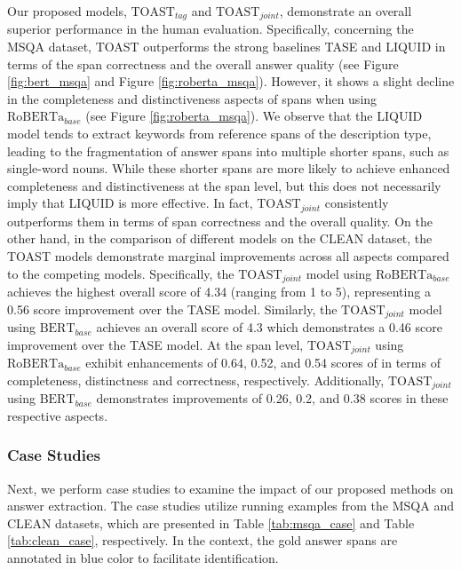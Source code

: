 \documentclass[a4paper]{cas-sc}
\newcommand{\1}[1]{\mathds{1}\left[#1\right]}
\newcommand{\figref}[1]{Figure \ref{#1}}
\newcommand{\tableref}[1]{Table \ref{#1}}
\begin{document}
Our proposed models, $\text{TOAST}_{tag}$ and $\text{TOAST}_{joint}$, demonstrate an overall superior performance in the human evaluation.
Specifically, concerning the MSQA dataset, TOAST outperforms the strong baselines TASE and LIQUID in terms of the span correctness and the overall answer quality (see \figref{fig:bert_msqa} and \figref{fig:roberta_msqa}). However, it shows a slight decline in the completeness and distinctiveness aspects of spans when using $\text{RoBERTa}_{base}$ (see  \figref{fig:roberta_msqa}). 
We observe that the LIQUID model tends to extract keywords from reference spans of the description type, leading to the fragmentation of answer spans into multiple shorter spans, such as single-word nouns. While these shorter spans are more likely to achieve enhanced completeness and distinctiveness at the span level, but this does not necessarily imply that LIQUID is more effective. In fact, $\text{TOAST}_{joint}$ consistently outperforms them in terms of span correctness and the overall quality. 
On the other hand, in the comparison of different models on the CLEAN dataset,
the TOAST models demonstrate marginal improvements across all aspects  compared to the competing models. 
Specifically, the $\text{TOAST}_{joint}$ model using $\text{RoBERTa}_{base}$ achieves the highest overall score of 4.34 (ranging from 1 to 5), representing a 0.56 score improvement over the TASE model. Similarly, the $\text{TOAST}_{joint}$ model using $\text{BERT}_{base}$ achieves an overall score of 4.3 which demonstrates a 0.46 score improvement  over the TASE model.
At the span level, $\text{TOAST}_{joint}$ using $\text{RoBERTa}_{base}$ exhibit enhancements of 0.64, 0.52, and 0.54 scores of in terms of completeness, distinctness and correctness, respectively. Additionally, $\text{TOAST}_{joint}$ using  $\text{BERT}_{base}$ demonstrates improvements of 0.26, 0.2, and 0.38 scores in these respective aspects.

\subsubsection{Case Studies}
\label{sec:case}
Next, we perform case studies to examine the impact of our proposed methods on answer extraction. 
The case studies utilize running examples from the MSQA and CLEAN datasets, which are presented in \tableref{tab:msqa_case} and \tableref{tab:clean_case}, respectively. 
In the context, the gold answer spans are annotated in blue color to facilitate identification.
\end{document}
